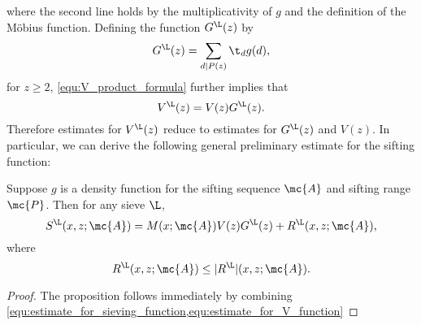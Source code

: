     where the second line holds by the multiplicativity of $g$ and the definition of the M\"obius function. Defining the function $G^{\L}(z)$ by
    \[
      G^{\L}(z) = \sum_{d \mid P(z)}\t_{d}g(d),
    \]
    for $z \ge 2$, \cref{equ:V_product_formula} further implies that
    \begin{equation}\label{equ:estimate_for_V_function}
      V^{\L}(z) = V(z)G^{\L}(z).
    \end{equation}
    Therefore estimates for $V^{\L}(z)$ reduce to estimates for $G^{\L}(z)$ and $V(z)$. In particular, we can derive the following general preliminary estimate for the sifting function:

    \begin{proposition}\label{prop:preliminary_sieve_estimate}
      Suppose $g$ is a density function for the sifting sequence $\mc{A}$ and sifting range $\mc{P}$. Then for any sieve $\L$,
      \[
        S^{\L}(x,z;\mc{A}) = M(x;\mc{A})V(z)G^{\L}(z)+R^{\L}(x,z;\mc{A}),
      \]
      where
      \[
        R^{\L}(x,z;\mc{A}) \le |R^{\L}|(x,z;\mc{A}).
      \]
    \end{proposition}
    \begin{proof}
      The proposition follows immediately by combining \cref{equ:estimate_for_sieving_function,equ:estimate_for_V_function}
    \end{proof}